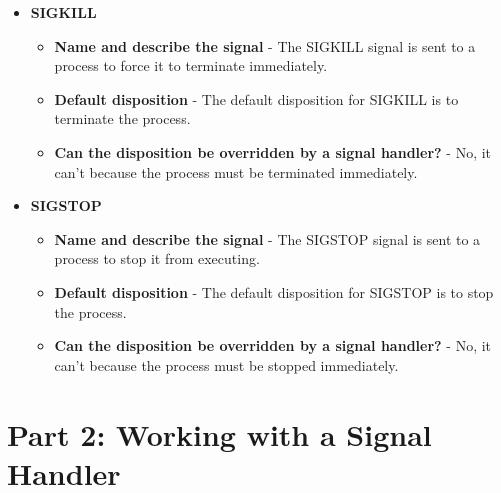 \documentclass{assignment}
\begin{document}
\begin{itemize}
\begin{itemize}
    \end{itemize}
    \item \textbf{SIGKILL}
    \begin{itemize}
        \item \textbf{Name and describe the signal} - The SIGKILL signal is sent to a process to force it to terminate immediately.
        \item \textbf{Default disposition} - The default disposition for SIGKILL is to terminate the process.
        \item \textbf{Can the disposition be overridden by a signal handler?} - No, it can't because the process must be terminated immediately.
    \end{itemize}
    \item \textbf{SIGSTOP}
    \begin{itemize}
        \item \textbf{Name and describe the signal} - The SIGSTOP signal is sent to a process to stop it from executing.
        \item \textbf{Default disposition} - The default disposition for SIGSTOP is to stop the process.
        \item \textbf{Can the disposition be overridden by a signal handler?} - No, it can't because the process must be stopped immediately.
    \end{itemize}
\end{itemize}


\section{Part 2: Working with a Signal Handler}




\end{document}
